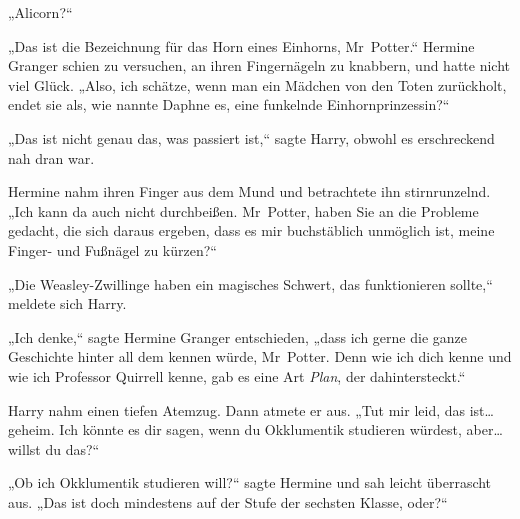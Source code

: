 „Alicorn?“

„Das ist die Bezeichnung für das Horn eines Einhorns, Mr~Potter.“
Hermine Granger schien zu versuchen, an ihren Fingernägeln zu knabbern, und hatte nicht viel Glück. „Also, ich schätze, wenn man ein Mädchen von den Toten zurückholt, endet sie als, wie nannte Daphne es, eine funkelnde Einhornprinzessin?“

„Das ist nicht genau das, was passiert ist,“ sagte Harry, obwohl es erschreckend nah dran war.

Hermine nahm ihren Finger aus dem Mund und betrachtete ihn stirnrunzelnd. „Ich kann da auch nicht durchbeißen. Mr~Potter, haben Sie an die Probleme gedacht, die sich daraus ergeben, dass es mir buchstäblich unmöglich ist, meine Finger- und Fußnägel zu kürzen?“

„Die Weasley-Zwillinge haben ein magisches Schwert, das funktionieren sollte,“ meldete sich Harry.

„Ich denke,“ sagte Hermine Granger entschieden, „dass ich gerne die ganze Geschichte hinter all dem kennen würde, Mr~Potter. Denn wie ich dich kenne und wie ich Professor Quirrell kenne, gab es eine Art \emph{Plan}, der dahintersteckt.“

Harry nahm einen tiefen Atemzug. Dann atmete er aus. „Tut mir leid, das ist… geheim. Ich könnte es dir sagen, wenn du Okklumentik studieren würdest, aber… willst du das?“

„Ob ich Okklumentik studieren will?“ sagte Hermine und sah leicht überrascht aus. „Das ist doch mindestens auf der Stufe der sechsten Klasse, oder?“

